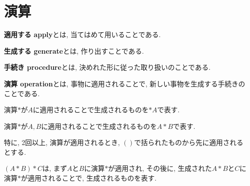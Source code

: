 \section{演算}
\begin{mean}
{\bf 適用する apply}とは, 当てはめて用いることである.
\end{mean}
\begin{mean}
{\bf 生成する generate}とは, 作り出すことである.
\end{mean}
\begin{mean}
{\bf 手続き procedure}とは, 決めれた形に従った取り扱いのことである.
\end{mean}
\begin{mean}
{\bf 演算 operation}とは, 事物に適用されることで, 新しい事物を生成する手続きのことである.
\end{mean}
\begin{Notation}
演算$*$が$A$に適用されることで生成されるものを$*A$で表す.
\end{Notation}
\begin{Notation}
演算$*$が$A,B$に適用されることで生成されるものを$A*B$で表す.
\end{Notation}
\begin{Notation}
特に, 2回以上, 演算が適用されるとき, $()$で括られたものから先に適用されるとする.
\end{Notation}
\begin{example}
$(A*B)*C$は, まず$A$と$B$に演算$*$が適用され, その後に, 生成された$A*B$と$C$に演算$*$が適用されることで, 生成されるものを表す.
\end{example}

